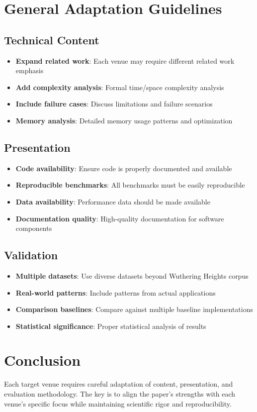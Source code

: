 \documentclass{article}
\begin{document}
\section{General Adaptation Guidelines}

\subsection{Technical Content}
\begin{itemize}
\item \textbf{Expand related work}: Each venue may require different related work emphasis
\item \textbf{Add complexity analysis}: Formal time/space complexity analysis
\item \textbf{Include failure cases}: Discuss limitations and failure scenarios
\item \textbf{Memory analysis}: Detailed memory usage patterns and optimization
\end{itemize}

\subsection{Presentation}
\begin{itemize}
\item \textbf{Code availability}: Ensure code is properly documented and available
\item \textbf{Reproducible benchmarks}: All benchmarks must be easily reproducible
\item \textbf{Data availability}: Performance data should be made available
\item \textbf{Documentation quality}: High-quality documentation for software components
\end{itemize}

\subsection{Validation}
\begin{itemize}
\item \textbf{Multiple datasets}: Use diverse datasets beyond Wuthering Heights corpus
\item \textbf{Real-world patterns}: Include patterns from actual applications
\item \textbf{Comparison baselines}: Compare against multiple baseline implementations
\item \textbf{Statistical significance}: Proper statistical analysis of results
\end{itemize}

\section{Conclusion}

Each target venue requires careful adaptation of content, presentation, and evaluation methodology. The key is to align the paper's strengths with each venue's specific focus while maintaining scientific rigor and reproducibility.
\end{document}
